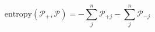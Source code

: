 \begin{equation}
\text{entropy}(\mathcal P_+,\mathcal P) = -\sum_j^n\mathcal P_{+j} -\sum_j^n\mathcal P_{-j}
\end{equation}